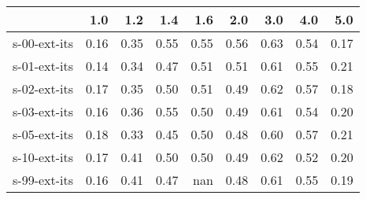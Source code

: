 \begin{tabular}{lrrrrrrrr}
\toprule
{} &  1.0 &  1.2 &  1.4 &  1.6 &  2.0 &  3.0 &  4.0 &  5.0 \\
\midrule
s-00-ext-its & 0.16 & 0.35 & 0.55 & 0.55 & 0.56 & 0.63 & 0.54 & 0.17 \\
s-01-ext-its & 0.14 & 0.34 & 0.47 & 0.51 & 0.51 & 0.61 & 0.55 & 0.21 \\
s-02-ext-its & 0.17 & 0.35 & 0.50 & 0.51 & 0.49 & 0.62 & 0.57 & 0.18 \\
s-03-ext-its & 0.16 & 0.36 & 0.55 & 0.50 & 0.49 & 0.61 & 0.54 & 0.20 \\
s-05-ext-its & 0.18 & 0.33 & 0.45 & 0.50 & 0.48 & 0.60 & 0.57 & 0.21 \\
s-10-ext-its & 0.17 & 0.41 & 0.50 & 0.50 & 0.49 & 0.62 & 0.52 & 0.20 \\
s-99-ext-its & 0.16 & 0.41 & 0.47 &  nan & 0.48 & 0.61 & 0.55 & 0.19 \\
\bottomrule
\end{tabular}
